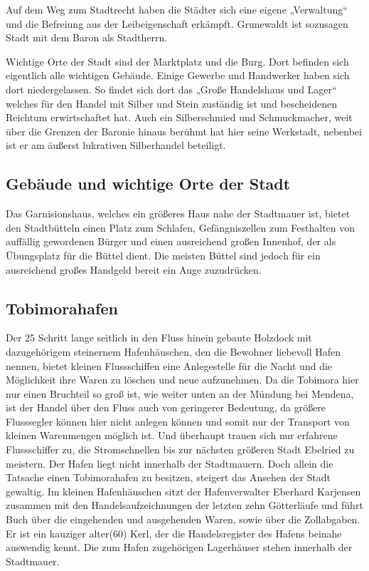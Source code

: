 Auf dem Weg zum Stadtrecht haben die Städter sich eine eigene „Verwaltung“ und die Befreiung aus der Leibeigenschaft erkämpft. Grunewaldt ist sozusagen Stadt mit dem Baron als Stadtherrn.

Wichtige Orte der Stadt sind der Marktplatz und die Burg. Dort befinden sich eigentlich alle wichtigen Gebäude. Einige Gewerbe und Handwerker haben sich dort niedergelassen. So findet sich dort das „Große Handelshaus und Lager“ welches für den Handel mit Silber und Stein zuständig ist und bescheidenen Reichtum erwirtschaftet hat. Auch ein Silberschmied und Schmuckmacher, weit über die Grenzen der Baronie hinaus berühmt hat hier seine Werkstadt, nebenbei ist er am äußerst lukrativen Silberhandel beteiligt.

\subsection{Gebäude und wichtige Orte der Stadt}

Das Garnisionshaus, welches ein größeres Haus nahe der Stadtmauer ist, bietet den Stadtbütteln einen Platz zum Schlafen, Gefängniszellen zum Festhalten von auffällig gewordenen Bürger und einen ausreichend großen Innenhof, der als Übungsplatz für die Büttel dient. Die meisten Büttel sind jedoch für ein ausreichend großes Handgeld bereit ein Auge zuzudrücken. 

\subsection{Tobimorahafen}
Der 25 Schritt lange seitlich in den Fluss hinein gebaute Holzdock mit dazugehörigem steinernem Hafenhäuschen, den die Bewohner liebevoll Hafen nennen, bietet kleinen Flussschiffen eine Anlegestelle für die Nacht und die Möglichkeit ihre Waren zu löschen und neue aufzunehmen. Da die Tobimora hier nur einen Bruchteil so groß ist, wie weiter unten an der Mündung bei Mendena, ist der Handel über den Fluss auch von geringerer Bedeutung, da größere Flusssegler können hier nicht anlegen können und somit nur der Transport von kleinen Warenmengen möglich ist. Und überhaupt trauen sich nur erfahrene Flussschiffer zu, die Stromschnellen bis zur nächsten größeren Stadt Ebelried zu meistern. Der Hafen liegt nicht innerhalb der Stadtmauern. Doch allein die Tatsache einen Tobimorahafen zu besitzen, steigert das Ansehen der Stadt gewaltig. Im kleinen Hafenhäuschen sitzt der Hafenverwalter Eberhard Karjensen zusammen mit den Handelsaufzeichnungen der letzten zehn Götterläufe und führt Buch über die eingehenden und ausgehenden Waren, sowie über die Zollabgaben. Er ist ein kauziger alter(60) Kerl, der die Handelsregister des Hafens beinahe auswendig kennt. Die zum Hafen zugehörigen Lagerhäuser stehen innerhalb der Stadtmauer.

